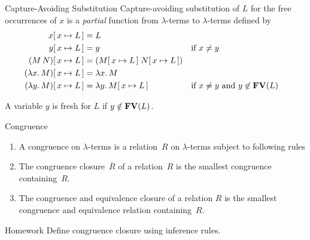 \begin{frame}{Capture-Avoiding Substitution}
  Capture-avoiding substitution of $L$ for the \alert{free occurrences} of $x$ is a
  \emph{partial} function from $\lambda$-terms to $\lambda$-terms defined by
  \begin{align*}
    x\subst{x}{L} & = L \\
    y\subst{x}{L} & = y && \text{if $x \neq y$} \\
    (M\, N)\subst{x}{L} & = (M\subst{x}{L}\; N\subst{x}{L}) \\
    (\lambda x.\, M)\subst{x}{L} & = \lambda x.\, M \\
    (\lambda y.\, M)\subst{x}{L} & = \lambda y.\, M\subst x L
                                 &&\text{if $x \neq y$ and $y \not\in \FV(L)$}
  \end{align*}
  \begin{definition}[Freshness]
    A variable $y$ is \alert{fresh} for $L$ if $y \notin \FV(L)$.  
  \end{definition}
\end{frame}
\begin{frame}{Congruence}
\begin{definition}
  \begin{enumerate}
    \item A \alert{congruence} on $\lambda$-terms is a 
      relation~$R$ on $\lambda$-terms subject to following rules
      \begin{multicols}{2}
        \begin{prooftree}
        \end{prooftree}
        \begin{prooftree}
        \end{prooftree}
      \end{multicols}
    \item The \alert{congruence closure}~$\overline{R}$ of a relation~$R$ is
      the smallest congruence containing~$R$. 
    \item The \alert{congruence and equivalence closure} of a relation $R$ 
      is the smallest congruence and equivalence relation
      containing~$R$. 
  \end{enumerate}
\end{definition}
\vfill
  \begin{block}{Homework}
    Define congruence closure using inference rules. 
  \end{block}
\end{frame}

